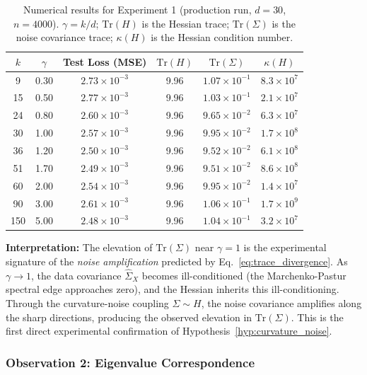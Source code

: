 \documentclass[
  journal=largetwo,
  year=2025,
  volume=37,
]{cup-journal}
\begin{document}
\begin{table}[htb]
\centering
\footnotesize
\caption{Numerical results for Experiment 1 (production run, $d=30$, $n=4000$). $\gamma = k/d$; $\mathrm{Tr}(H)$ is the Hessian trace; $\mathrm{Tr}(\Sigma)$ is the noise covariance trace; $\kappa(H)$ is the Hessian condition number.}
\label{tab:exp1_data}
\begin{tabular}{@{}cccccc@{}}
\toprule
$k$ & $\gamma$ & Test Loss (MSE) & $\mathrm{Tr}(H)$ & $\mathrm{Tr}(\Sigma)$ & $\kappa(H)$ \\
\midrule
9  & 0.30 & $2.73 \times 10^{-3}$ & 9.96 & $1.07 \times 10^{-1}$ & $8.3 \times 10^{7}$ \\
15 & 0.50 & $2.77 \times 10^{-3}$ & 9.96 & $1.03 \times 10^{-1}$ & $2.1 \times 10^{7}$ \\
24 & 0.80 & $2.60 \times 10^{-3}$ & 9.96 & $9.65 \times 10^{-2}$ & $6.3 \times 10^{7}$ \\
30 & 1.00 & $2.57 \times 10^{-3}$ & 9.96 & $9.95 \times 10^{-2}$ & $1.7 \times 10^{8}$ \\
36 & 1.20 & $2.50 \times 10^{-3}$ & 9.96 & $9.52 \times 10^{-2}$ & $6.1 \times 10^{8}$ \\
51 & 1.70 & $2.49 \times 10^{-3}$ & 9.96 & $9.51 \times 10^{-2}$ & $8.6 \times 10^{8}$ \\
60 & 2.00 & $2.54 \times 10^{-3}$ & 9.96 & $9.95 \times 10^{-2}$ & $1.4 \times 10^{7}$ \\
90 & 3.00 & $2.61 \times 10^{-3}$ & 9.96 & $1.06 \times 10^{-1}$ & $1.7 \times 10^{9}$ \\
150& 5.00 & $2.48 \times 10^{-3}$ & 9.96 & $1.04 \times 10^{-1}$ & $3.2 \times 10^{7}$ \\
\bottomrule
\end{tabular}
\end{table}

\textbf{Interpretation:} The elevation of $\mathrm{Tr}(\Sigma)$ near $\gamma = 1$ is the experimental signature of the \textit{noise amplification} predicted by Eq.~\eqref{eq:trace_divergence}. As $\gamma \to 1$, the data covariance $\hat{\Sigma}_X$ becomes ill-conditioned (the Marchenko-Pastur spectral edge approaches zero), and the Hessian inherits this ill-conditioning. Through the curvature-noise coupling $\Sigma \sim H$, the noise covariance amplifies along the sharp directions, producing the observed elevation in $\mathrm{Tr}(\Sigma)$. This is the first direct experimental confirmation of Hypothesis~\ref{hyp:curvature_noise}.

\subsubsection{Observation 2: Eigenvalue Correspondence}
\end{document}
